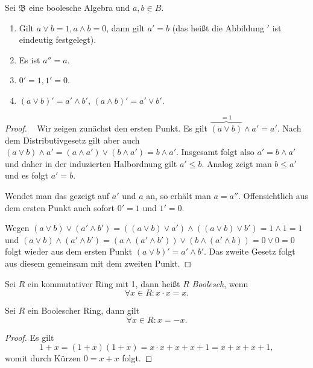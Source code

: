 \begin{lemma}
    Sei $\mathfrak{B}$ eine boolesche Algebra und $a,b \in B$.
    \begin{enumerate}
        \item Gilt $a \lor b = 1, a \land b = 0$, dann gilt $a' = b$ (das heißt die Abbildung $'$ ist eindeutig festgelegt).
        \item Es ist $a'' = a$.
        \item $0' = 1, 1' = 0$.
        \item $(a \lor b)' = a' \land b'$, $(a \land b)' = a' \lor b'$.
    \end{enumerate}
\end{lemma}
\begin{proof}{\ }
    Wir zeigen zunächst den ersten Punkt. Es gilt $\overbrace{(a\lor b)}^{=1}\land a'=a'$. Nach dem Distributivgesetz gilt aber auch $(a\lor b)\land a'=(a\land a')\lor (b\land a')=b\land a'$. Insgesamt folgt also $a'=b\land a'$ und daher in der induzierten Halbordnung gilt $a'\le b$. Analog zeigt man $b\leq a'$ und es folgt $a'=b$.

    Wendet man das gezeigt auf $a'$ und $a$ an, so erhält man $a=a''$. Offensichtlich aus dem ersten Punkt auch sofort $0'=1$ und $1'=0$.

    Wegen $(a\lor b)\lor (a'\land b')=((a\lor b)\lor a') \land ((a\lor b)\lor b')=1\land 1=1$ und $(a\lor b)\land (a'\land b')=(a\land (a'\land b'))\lor (b\land(a'\land b))=0\lor 0=0$ folgt wieder aus dem ersten Punkt $(a\lor b)'=a'\land b'$. Das zweite Gesetz folgt aus diesem gemeinsam mit dem zweiten Punkt.
\end{proof}


\begin{definition}
    Sei $R$ ein kommutativer Ring mit 1, dann heißt $R$ \emph{Boolesch}, wenn
    $$ \forall x \in R : x \cdot x = x. $$
\end{definition}

\begin{lemma}
    Sei $R$ ein Boolescher Ring, dann gilt
    $$ \forall x \in R : x = -x. $$
\end{lemma}

\begin{proof}
    Es gilt
    $$ 1 + x = (1+x)(1+x) = x \cdot x + x + x + 1 = x + x + x + 1, $$
    womit durch Kürzen $ 0 = x + x $ folgt.
\end{proof}

